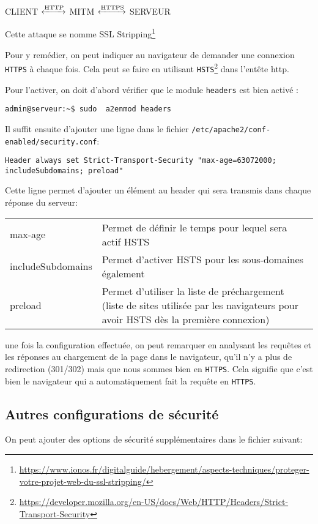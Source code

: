 \begin{center} 
    CLIENT $\xleftrightarrow{\text{HTTP}}$ MITM $\xleftrightarrow{\text{HTTPS}}$ SERVEUR
 \end{center}
 
Cette attaque se nomme SSL Stripping\footnote{\url{https://www.ionos.fr/digitalguide/hebergement/aspects-techniques/proteger-votre-projet-web-du-ssl-stripping/}}

Pour y remédier, on peut indiquer au navigateur de demander une connexion \texttt{HTTPS} à chaque fois. Cela peut se faire en utilisant \texttt{HSTS}\footnote{\url{https://developer.mozilla.org/en-US/docs/Web/HTTP/Headers/Strict-Transport-Security}} dans l'entête http.

Pour l'activer, on doit d'abord vérifier que le module \texttt{headers} est bien activé :
 
    \begin{verbatim}
admin@serveur:~$ sudo  a2enmod headers    
    \end{verbatim}
 

Il suffit ensuite d'ajouter une ligne dans le fichier \texttt{/etc/apache2/conf-enabled/security.conf}:

 
\begin{verbatim}
Header always set Strict-Transport-Security "max-age=63072000; includeSubdomains; preload"
\end{verbatim}


Cette ligne permet d'ajouter un élément au header qui sera transmis dans chaque réponse du serveur:
 
    \begin{tabular}{l|p{10cm}}
        max-age & Permet de définir le temps pour lequel sera actif HSTS\\
        includeSubdomains&Permet d'activer HSTS pour les sous-domaines également\\
        preload&Permet d'utiliser la liste de préchargement (liste de sites utilisée par les navigateurs pour avoir HSTS dès la première connexion)
    \end{tabular}
 

une fois la configuration effectuée, on peut remarquer en analysant les requêtes et les réponses au chargement de la page dans le navigateur, qu'il n'y a plus de redirection (301/302) mais que nous sommes bien en \texttt{HTTPS}. Cela signifie que c'est bien le navigateur qui a automatiquement fait la requête en \texttt{HTTPS}.

\subsection{Autres configurations de sécurité}
On peut ajouter des options de sécurité supplémentaires dans le fichier suivant:

